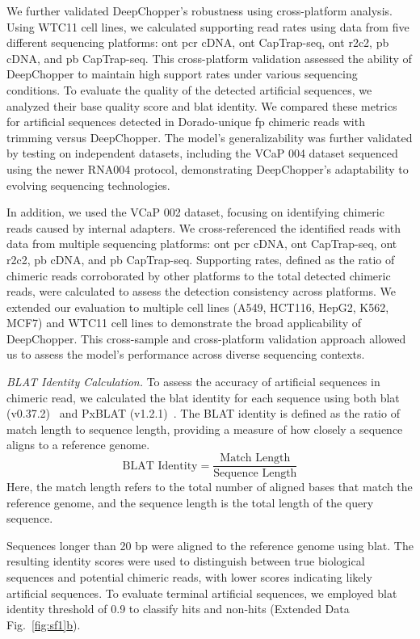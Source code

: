 \documentclass[pdflatex, sn-mathphys-num, lineno]{sn-jnl}%
\newcommand{\edfigref}[2]{Extended Data Fig.~\hyperref[#1]{\ref*{#1}#2}}
\theoremstyle{thmstyleone}%
\theoremstyle{thmstyletwo}%
\theoremstyle{thmstylethree}%
\begin{document}
We further validated DeepChopper's robustness using cross-platform analysis.
Using WTC11 cell lines, we calculated supporting read rates using data from five different sequencing platforms: \gls{ont} \gls{pcr} cDNA, \gls{ont} CapTrap-seq, \gls{ont} \gls{r2c2}, \gls{pb} cDNA, and \gls{pb} CapTrap-seq.
This cross-platform validation assessed the ability of DeepChopper to maintain high support rates under various sequencing conditions.
To evaluate the quality of the detected artificial sequences, we analyzed their base quality score and \gls{blat} identity.
We compared these metrics for artificial sequences detected in Dorado-unique \gls{fp} chimeric reads with trimming versus DeepChopper.
The model's generalizability was further validated by testing on independent datasets, including the VCaP 004 dataset sequenced using the newer RNA004 protocol, demonstrating DeepChopper's adaptability to evolving sequencing technologies.

In addition, we used the VCaP 002 dataset, focusing on identifying chimeric reads caused by internal adapters.
We cross-referenced the identified reads with data from multiple sequencing platforms: \gls{ont} \gls{pcr} cDNA, \gls{ont} CapTrap-seq, \gls{ont} \gls{r2c2}, \gls{pb} cDNA, and \gls{pb} CapTrap-seq.
Supporting rates, defined as the ratio of chimeric reads corroborated by other platforms to the total detected chimeric reads, were calculated to assess the detection consistency across platforms.
We extended our evaluation to multiple cell lines (A549, HCT116, HepG2, K562, MCF7) and WTC11 cell lines to demonstrate the broad applicability of DeepChopper.
This cross-sample and cross-platform validation approach allowed us to assess the model's performance across diverse sequencing contexts.

\textit{BLAT Identity Calculation.} To assess the accuracy of artificial sequences in chimeric read, we calculated the \gls{blat} identity for each sequence using both \gls{blat} (v0.37.2)~\cite{kent2002blat} and PxBLAT (v1.2.1)~\cite{li2024pxblat}.
The BLAT identity is defined as the ratio of match length to sequence length, providing a measure of how closely a sequence aligns to a reference genome.
\[
	\textrm{BLAT Identity} = \frac{\textrm{Match Length}}{\textrm{Sequence Length}}
\]
Here, the match length refers to the total number of aligned bases that match the reference genome, and the sequence length is the total length of the query sequence.

Sequences longer than 20 bp were aligned to the reference genome using \gls{blat}.
The resulting identity scores were used to distinguish between true biological sequences and potential chimeric reads, with lower scores indicating likely artificial sequences.
To evaluate terminal artificial sequences, we employed \gls{blat} identity threshold of 0.9 to classify hits and non-hits (\edfigref{fig:sf1}{b}).
\end{document}
